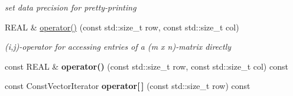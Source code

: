 \begin{DoxyCompactItemize}
\begin{DoxyCompactList}\small\item\em set data precision for pretty-\/printing \item\end{DoxyCompactList}\item 
REAL \& \hyperlink{classhdnum_1_1DenseMatrix_aaaedd0bde6bff8e04a0df7ef2afccbf5}{operator()} (const std::size\_\-t row, const std::size\_\-t col)
\begin{DoxyCompactList}\small\item\em (i,j)-\/operator for accessing entries of a (m x n)-\/matrix directly \item\end{DoxyCompactList}\item 
\hypertarget{classhdnum_1_1DenseMatrix_ab7c954af7b135112fa5f729dbac12180}{
const REAL \& {\bfseries operator()} (const std::size\_\-t row, const std::size\_\-t col) const }
\label{classhdnum_1_1DenseMatrix_ab7c954af7b135112fa5f729dbac12180}

\item 
\hypertarget{classhdnum_1_1DenseMatrix_a707394b6c91149af1b9c8d58d2936c54}{
const ConstVectorIterator {\bfseries operator\mbox{[}$\,$\mbox{]}} (const std::size\_\-t row) const }
\label{classhdnum_1_1DenseMatrix_a707394b6c91149af1b9c8d58d2936c54}


\end{DoxyCompactItemize}
